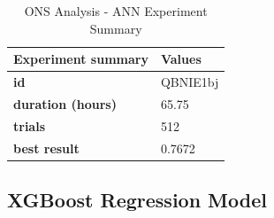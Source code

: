 \begin{table}[!htpb]
\small
\centering
\caption{ONS Analysis - ANN Experiment Summary}
\label{tab:ONSANN_summary}
\begin{tabular}{ll} \hline
\textbf{Experiment summary} & \textbf{Values} \\ \hline
\textbf{id}                 & QBNIE1bj        \\
\textbf{duration (hours)}   & 65.75           \\
\textbf{trials}             & 512             \\
\textbf{best result}        & 0.7672         \\ \hline
\end{tabular}
\end{table}


\subsection{XGBoost Regression Model} \label{subsection:XGBoost Regression Model}


